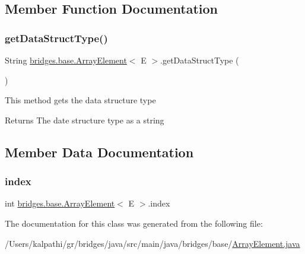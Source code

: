 \subsection{Member Function Documentation}
\mbox{\label{classbridges_1_1base_1_1_array_element_a1d4f3fae7bd986237e364c2cce0bea77}} 
\subsubsection{\texorpdfstring{getDataStructType()}{getDataStructType()}}
{\footnotesize\ttfamily String \mbox{\hyperlink{classbridges_1_1base_1_1_array_element}{bridges.\+base.\+Array\+Element}}$<$ E $>$.get\+Data\+Struct\+Type (\begin{DoxyParamCaption}{ }\end{DoxyParamCaption})}

This method gets the data structure type

\begin{DoxyReturn}{Returns}
The date structure type as a string 
\end{DoxyReturn}


\subsection{Member Data Documentation}
\mbox{\label{classbridges_1_1base_1_1_array_element_a79c69e5046da8c297026d1e457a23182}} 
\subsubsection{\texorpdfstring{index}{index}}
{\footnotesize\ttfamily int \mbox{\hyperlink{classbridges_1_1base_1_1_array_element}{bridges.\+base.\+Array\+Element}}$<$ E $>$.index\hspace{0.3cm}{\ttfamily [static]}}



The documentation for this class was generated from the following file\+:\begin{DoxyCompactItemize}
\item 
/\+Users/kalpathi/gr/bridges/java/src/main/java/bridges/base/\mbox{\hyperlink{_array_element_8java}{Array\+Element.\+java}}\end{DoxyCompactItemize}
